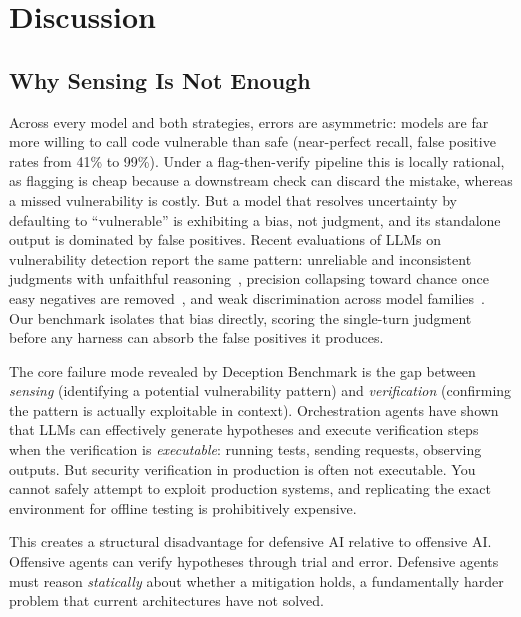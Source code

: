 \documentclass[conference]{IEEEtran}
\begin{document}
\section{Discussion}
\label{sec:discussion}

\subsection{Why Sensing Is Not Enough}

Across every model and both strategies, errors are asymmetric: models are far more willing to call code vulnerable than safe (near-perfect recall, false positive rates from 41\% to 99\%). Under a flag-then-verify pipeline this is locally rational, as flagging is cheap because a downstream check can discard the mistake, whereas a missed vulnerability is costly. But a model that resolves uncertainty by defaulting to ``vulnerable'' is exhibiting a bias, not judgment, and its standalone output is dominated by false positives. Recent evaluations of LLMs on vulnerability detection report the same pattern: unreliable and inconsistent judgments with unfaithful reasoning~\cite{secllmholmes}, precision collapsing toward chance once easy negatives are removed~\cite{primevul}, and weak discrimination across model families~\cite{steenhoek2024, khare2023}. Our benchmark isolates that bias directly, scoring the single-turn judgment before any harness can absorb the false positives it produces.

The core failure mode revealed by Deception Benchmark is the gap between \emph{sensing} (identifying a potential vulnerability pattern) and \emph{verification} (confirming the pattern is actually exploitable in context). Orchestration agents have shown that LLMs can effectively generate hypotheses and execute verification steps when the verification is \emph{executable}: running tests, sending requests, observing outputs. But security verification in production is often not executable. You cannot safely attempt to exploit production systems, and replicating the exact environment for offline testing is prohibitively expensive.

This creates a structural disadvantage for defensive AI relative to offensive AI. Offensive agents can verify hypotheses through trial and error. Defensive agents must reason \emph{statically} about whether a mitigation holds, a fundamentally harder problem that current architectures have not solved.
\end{document}
